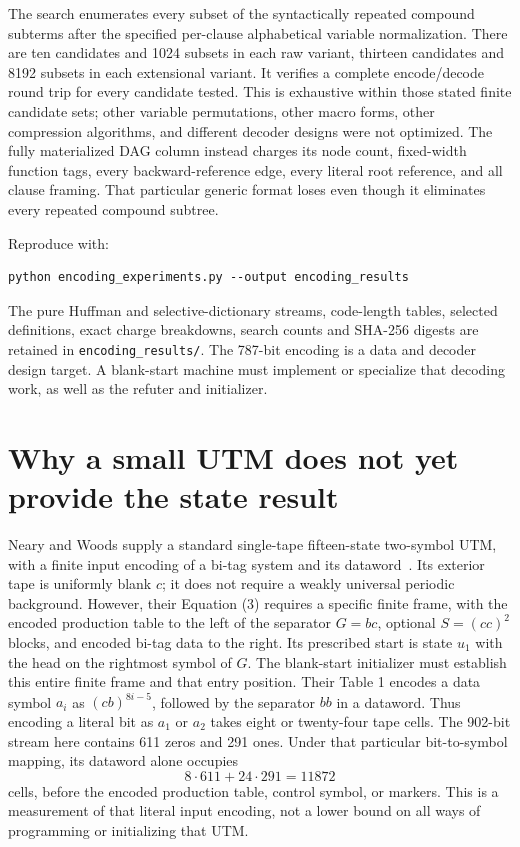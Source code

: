 \documentclass[11pt]{article}
\begin{document}
The search enumerates every subset of the syntactically repeated
compound subterms after the specified per-clause alphabetical variable
normalization. There are ten candidates and 1024 subsets in each raw
variant, thirteen candidates and 8192 subsets in each extensional
variant. It verifies a complete encode/decode round trip for every
candidate tested. This is exhaustive within those stated finite candidate
sets; other variable permutations, other macro forms, other compression
algorithms, and different decoder designs were not optimized. The fully
materialized DAG column instead charges its node count, fixed-width
function tags, every backward-reference edge, every literal root
reference, and all clause framing. That particular generic format loses
even though it eliminates every repeated compound subtree.

Reproduce with:
\begin{verbatim}
python encoding_experiments.py --output encoding_results
\end{verbatim}
The pure Huffman and selective-dictionary streams, code-length tables,
selected definitions, exact charge breakdowns, search counts and SHA-256
digests are retained in \texttt{encoding\_results/}. The 787-bit encoding
is a data and decoder design target. A blank-start machine must implement
or specialize that decoding work, as well as the refuter and initializer.

\section{Why a small UTM does not yet provide the state result}

Neary and Woods supply a standard single-tape fifteen-state two-symbol
UTM, with a finite input encoding of a bi-tag system and its dataword~\cite{nearywoods2009}.
Its exterior tape is uniformly blank $c$; it does not require a weakly
universal periodic background. However, their Equation (3) requires a
specific finite frame, with the encoded production table to the left of
the separator $G=bc$, optional $S=(cc)^2$ blocks, and encoded bi-tag
data to the right. Its prescribed start is state $u_1$ with the head on
the rightmost symbol of $G$. The blank-start initializer must establish
this entire finite frame and that entry position.
Their Table 1 encodes a data symbol $a_i$ as $(cb)^{8i-5}$, followed by
the separator $bb$ in a dataword. Thus encoding a literal bit as $a_1$
or $a_2$ takes eight or twenty-four tape cells. The 902-bit stream here
contains 611 zeros and 291 ones. Under that particular bit-to-symbol
mapping, its dataword alone occupies
\[
 8\cdot611+24\cdot291=11872
\]
cells, before the encoded production table, control symbol, or markers.
This is a measurement of that literal input encoding, not a lower bound
on all ways of programming or initializing that UTM.
\end{document}
